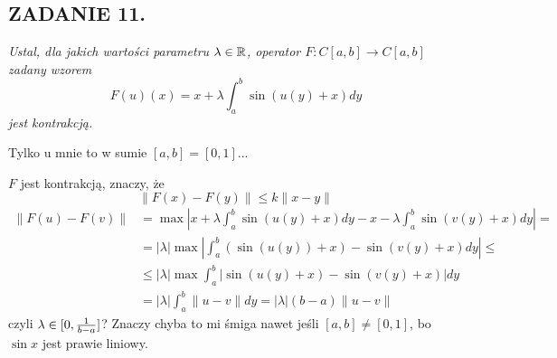 \documentclass{article}
\begin{document}
\subsection*{ZADANIE 11.}
{\color{purple}\emph{Ustal, dla jakich wartości parametru $\lambda\in\mathbb{R}$, operator $F:C[a,b]\to C[a,b]$ zadany wzorem}
$$F(u)(x)=x+\lambda\int_a^b\sin(u(y)+x)dy$$
\emph{jest kontrakcją.}
}

Tylko u mnie to w sumie $[a, b]=[0, 1]$...

$F$ jest kontrakcją, znaczy, że
$$\|F(x)-F(y)\|\leq k\|x-y\|$$
\begin{align*}
    \|F(u)-F(v)\|&=\max\left|x+\lambda\int_a^b\sin(u(y)+x)dy-x-\lambda\int_a^b\sin(v(y)+x)dy\right|=\\
    &=|\lambda|\max\left|\int_a^b(\sin(u(y))+x)-\sin(v(y)+x)dy\right|\leq\\
    &\leq|\lambda|\max\int_a^b|\sin(u(y)+x)-\sin(v(y)+x)|dy\\
    &=|\lambda|\int_a^b\|u-v\|dy=|\lambda|(b-a)\|u-v\|
\end{align*}
czyli $\lambda\in[0, {1\over b-a}]$? Znaczy chyba to mi śmiga nawet jeśli $[a, b]\neq[0, 1]$, bo $\sin x$ jest prawie liniowy.
\end{document}
